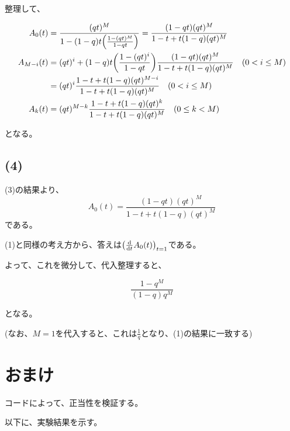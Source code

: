 \documentclass[a4paper, 10pt, dvipdfmx]{jlreq}
\begin{document}
整理して、

\begin{align*}
  A_0(t)     & =\frac{(qt)^M}{1-(1-q)t\qty(\frac{1-(qt)^M}{1-qt})} = \frac{(1-qt)(qt)^M}{1-t+t(1-q)(qt)^M}         \\
  A_{M-i}(t) & =(qt)^i+(1-q)t\qty(\frac{1-(qt)^i}{1-qt})\frac{(1-qt)(qt)^M}{1-t+t(1-q)(qt)^M} \quad (0 < i \leq M) \\
             & =   (qt)^i \frac{1-t+t(1-q)(qt)^{M-i}}{1-t+t(1-q)(qt)^M} \quad (0 < i \leq M)                       \\
  A_{k}(t)   & =(qt)^{M-k} \frac{1-t+t(1-q)(qt)^{k}}{1-t+t(1-q)(qt)^M} \quad (0 \leq k < M)
\end{align*}

となる。

\subsection*{(4)}

(3)の結果より、
\begin{equation*}
  A_0(t) =\frac{(1-qt)(qt)^M}{1-t+t(1-q)(qt)^M}
\end{equation*}
である。

(1)と同様の考え方から、答えは$\qty(\dv{t}A_0(t))_{t=1}$である。

よって、これを微分して、代入整理すると、

\begin{equation*}
  \frac{1-q^M}{(1-q)q^M}
\end{equation*}

となる。

(なお、$M=1$を代入すると、これは$\frac{1}{q}$となり、(1)の結果に一致する)

\section{おまけ}

コードによって、正当性を検証する。



以下に、実験結果を示す。
\end{document}

